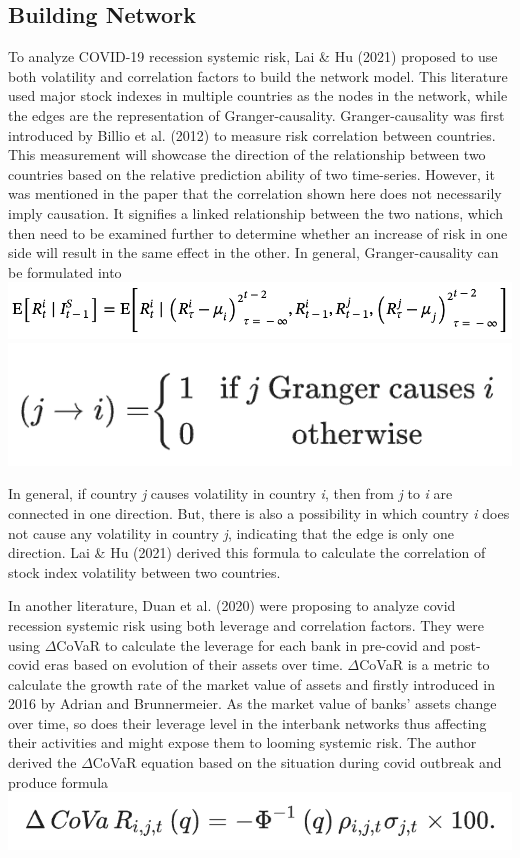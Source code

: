 \documentclass[a4paper,11pt]{article}
\begin{document}
\subsection{Building Network}
To analyze COVID-19 recession systemic risk, Lai \& Hu (2021) proposed to use both volatility and correlation factors to build the network model. This literature used major stock indexes in multiple countries as the nodes in the network, while the edges are the representation of Granger-causality. Granger-causality was first introduced by Billio et al. (2012) to measure risk correlation between countries. This measurement will showcase the direction of the relationship between two countries based on the relative prediction ability of two time-series. However, it was mentioned in the paper that the correlation shown here does not necessarily imply causation. It signifies a linked relationship between the two nations, which then need to be examined further to determine whether an increase of risk in one side will result in the same effect in the other. In general, Granger-causality can be formulated into
\includegraphics[scale=0.5]{granger_causality_1.png}
\includegraphics[scale=0.5]{granger_causality_2.png}

In general, if country \textit{j} causes volatility in country \textit{i}, then from \textit{j} to \textit{i} are connected in one direction. But, there is also a possibility in which country \textit{i} does not cause any volatility in country \textit{j}, indicating that the edge is only one direction. Lai \& Hu (2021) derived this formula to calculate the correlation of stock index volatility between two countries.

In another literature, Duan et al. (2020) were proposing to analyze covid recession systemic risk using both leverage and correlation factors. They were using $\Delta$CoVaR to calculate the leverage for each bank in pre-covid and post-covid eras based on evolution of their assets over time. $\Delta$CoVaR is a metric to calculate the growth rate of the market value of assets and firstly introduced in 2016 by Adrian and Brunnermeier. As the market value of banks’ assets change over time, so does their leverage level in the interbank networks thus affecting their activities and might expose them to looming systemic risk. The author derived the $\Delta$CoVaR equation based on the situation during covid outbreak and produce formula
\includegraphics[scale=0.9]{covar.png}
\end{document}
